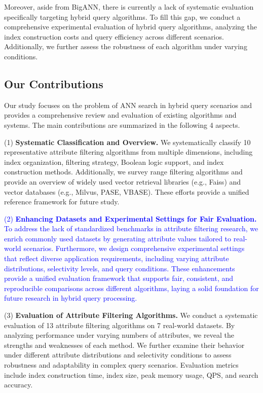 \documentclass[sigconf, nonacm]{acmart}
\begin{document}
	Moreover, aside from BigANN, there is currently a lack of systematic evaluation specifically targeting hybrid query algorithms. To fill this gap, we conduct a comprehensive experimental evaluation of hybrid query algorithms, analyzing the index construction costs and query efficiency across different scenarios. Additionally, we further assess the robustness of each algorithm under varying conditions.
	
	
	\subsection{Our Contributions}
	
	Our study focuses on the problem of ANN search in hybrid query scenarios and provides a comprehensive review and evaluation of existing algorithms and systems. The main contributions are summarized in the following 4 aspects.
	
	(1)\textbf{ Systematic Classification and Overview.}
	We systematically classify 10 representative attribute filtering algorithms from multiple dimensions, including index organization, filtering strategy, Boolean logic support, and index construction methods. Additionally, we survey range filtering algorithms and provide an overview of widely used vector retrieval libraries (e.g., Faiss) and vector databases (e.g., Milvus, PASE, VBASE). These efforts provide a unified reference framework for future study.
	
	\textcolor{blue}{
	(2) \textbf{Enhancing Datasets and Experimental Settings for Fair Evaluation.}
	To address the lack of standardized benchmarks in attribute filtering research, we enrich commonly used datasets by generating attribute values tailored to real-world scenarios. Furthermore, we design comprehensive experimental settings that reflect diverse application requirements, including varying attribute distributions, selectivity levels, and query conditions. These enhancements provide a unified evaluation framework that supports fair, consistent, and reproducible comparisons across different algorithms, laying a solid foundation for future research in hybrid query processing.
	}
	
	(3)\textbf{ Evaluation of Attribute Filtering Algorithms.}
	We conduct a systematic evaluation of 13 attribute filtering algorithms on 7 real-world datasets. By analyzing performance under varying numbers of attributes, we reveal the strengths and weaknesses of each method. We further examine their behavior under different attribute distributions and selectivity conditions to assess robustness and adaptability in complex query scenarios. Evaluation metrics include index construction time, index size, peak memory usage, QPS, and search accuracy.
	
\end{document}
